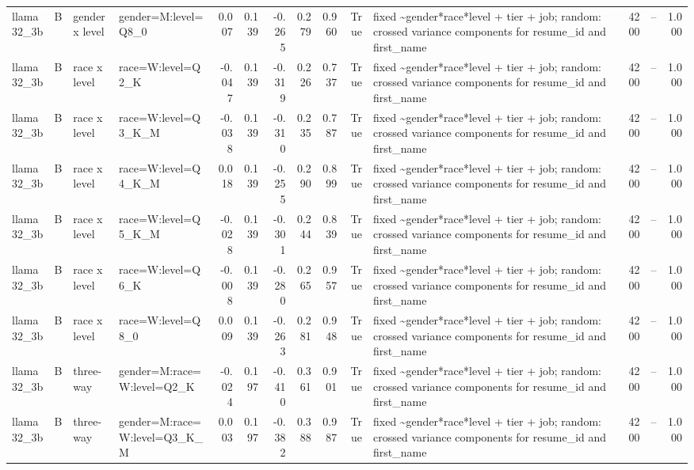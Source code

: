 \begin{tabular}{llllrrrrrrlrlr}
llama32\_3b & B & gender x level & gender=M:level=Q8\_0 & 0.007 & 0.139 & -0.265 & 0.279 & 0.960 & True & fixed \textasciitilde \space gender*race*level + tier + job; random: crossed variance components for resume\_id and first\_name & 4200 & -- & 1.000 \\
llama32\_3b & B & race x level & race=W:level=Q2\_K & -0.047 & 0.139 & -0.319 & 0.226 & 0.737 & True & fixed \textasciitilde \space gender*race*level + tier + job; random: crossed variance components for resume\_id and first\_name & 4200 & -- & 1.000 \\
llama32\_3b & B & race x level & race=W:level=Q3\_K\_M & -0.038 & 0.139 & -0.310 & 0.235 & 0.787 & True & fixed \textasciitilde \space gender*race*level + tier + job; random: crossed variance components for resume\_id and first\_name & 4200 & -- & 1.000 \\
llama32\_3b & B & race x level & race=W:level=Q4\_K\_M & 0.018 & 0.139 & -0.255 & 0.290 & 0.899 & True & fixed \textasciitilde \space gender*race*level + tier + job; random: crossed variance components for resume\_id and first\_name & 4200 & -- & 1.000 \\
llama32\_3b & B & race x level & race=W:level=Q5\_K\_M & -0.028 & 0.139 & -0.301 & 0.244 & 0.839 & True & fixed \textasciitilde \space gender*race*level + tier + job; random: crossed variance components for resume\_id and first\_name & 4200 & -- & 1.000 \\
llama32\_3b & B & race x level & race=W:level=Q6\_K & -0.008 & 0.139 & -0.280 & 0.265 & 0.957 & True & fixed \textasciitilde \space gender*race*level + tier + job; random: crossed variance components for resume\_id and first\_name & 4200 & -- & 1.000 \\
llama32\_3b & B & race x level & race=W:level=Q8\_0 & 0.009 & 0.139 & -0.263 & 0.281 & 0.948 & True & fixed \textasciitilde \space gender*race*level + tier + job; random: crossed variance components for resume\_id and first\_name & 4200 & -- & 1.000 \\
llama32\_3b & B & three-way & gender=M:race=W:level=Q2\_K & -0.024 & 0.197 & -0.410 & 0.361 & 0.901 & True & fixed \textasciitilde \space gender*race*level + tier + job; random: crossed variance components for resume\_id and first\_name & 4200 & -- & 1.000 \\
llama32\_3b & B & three-way & gender=M:race=W:level=Q3\_K\_M & 0.003 & 0.197 & -0.382 & 0.388 & 0.987 & True & fixed \textasciitilde \space gender*race*level + tier + job; random: crossed variance components for resume\_id and first\_name & 4200 & -- & 1.000 \\

\end{tabular}
